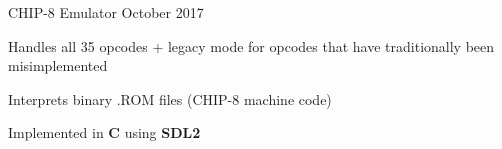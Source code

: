 \begin{cventries}

    \cventry
    {CHIP-8 Emulator} %
    {} %
    {}{October 2017}{
        \begin{cvitems} %
            \item {Handles all 35 opcodes + legacy mode for opcodes that have traditionally been misimplemented}
            \item {Interprets binary .ROM files (CHIP-8 machine code)}
            \item {Implemented in \textbf{C} using \textbf{SDL2}}
        \end{cvitems}
    }




\end{cventries}
